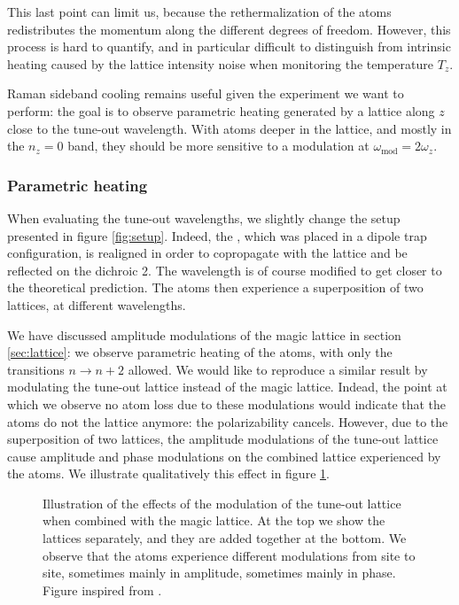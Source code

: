 \documentclass[11pt]{article}
\numberwithin{equation}{section}
\numberwithin{figure}{section}
\begin{document}
This last point can limit us, because the rethermalization of the atoms redistributes the momentum along the different degrees of freedom. However, this process is hard to quantify, and in particular difficult to distinguish from intrinsic heating caused by the lattice intensity noise when monitoring the temperature $T_z$.

Raman sideband cooling remains useful given the experiment we want to perform: the goal is to observe parametric heating generated by a lattice along $z$ close to the tune-out wavelength. With atoms deeper in the lattice, and mostly in the $n_z = 0$ band, they should be more sensitive to a modulation at $\omega_\text{mod} = 2 \omega_z$.

\subsubsection{Parametric heating}
\label{sec:para_heating}

When evaluating the tune-out wavelengths, we slightly change the setup presented in figure \ref{fig:setup}. Indeed, the , which was placed in a dipole trap configuration, is realigned in order to copropagate with the lattice and be reflected on the dichroic 2. The wavelength is of course modified to get closer to the theoretical prediction. The atoms then experience a superposition of two lattices, at different wavelengths.

We have discussed amplitude modulations of the magic lattice in section \ref{sec:lattice}: we observe parametric heating of the atoms, with only the transitions $n \rightarrow n + 2$ allowed. We would like to reproduce a similar result by modulating the tune-out lattice instead of the magic lattice. Indead, the point at which we observe no atom loss due to these modulations would indicate that the atoms do not  the lattice anymore: the polarizability cancels. However, due to the superposition of two lattices, the amplitude modulations of the tune-out lattice cause amplitude and phase modulations on the combined lattice experienced by the atoms. We illustrate qualitatively this effect in figure \ref{fig:tune_out}.

%
\begin{figure}[htbp]
	\centering
	\small
	\def\svgwidth{0.65\linewidth}
    
    \caption{\small Illustration of the effects of the modulation of the tune-out lattice when combined with the magic lattice. At the top we show the lattices separately, and they are added together at the bottom. We observe that the atoms experience different modulations from site to site, sometimes mainly in amplitude, sometimes mainly in phase. Figure inspired from \cite{2020_heinz}.}
    \label{fig:tune_out}
\end{figure}
%
\end{document}
